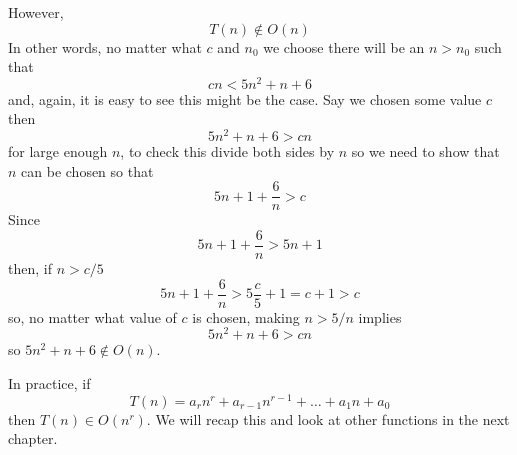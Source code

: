 \documentclass[11pt,a4paper]{scrartcl}
\begin{document}
However, 
\begin{equation}
T(n)\not\in O(n)
\end{equation}
In other words, no matter what $c$ and $n_0$ we choose there will be an $n>n_0$ such that
\begin{equation}
cn<5n^2+n+6
\end{equation}
and, again, it is easy to see this might be the case. Say we chosen
some value $c$ then
\begin{equation}
5n^2+n+6>cn
\end{equation}
for large enough $n$, to check this divide both sides by $n$ so we need to show that $n$ can be chosen so that
\begin{equation}
5n+1+\frac{6}{n}>c
\end{equation}
Since 
\begin{equation}
5n+1+\frac{6}{n}>5n+1
\end{equation}
then, if $n>c/5$
\begin{equation}
5n+1+\frac{6}{n}>5\frac{c}{5}+1=c+1>c
\end{equation}
so, no matter what value of $c$ is chosen, making $n>5/n$ implies
\begin{equation}
5n^2+n+6>cn
\end{equation}
so $5n^2+n+6\not\in O(n)$. 

In practice, if
\begin{equation}
T(n)=a_rn^r+a_{r-1}n^{r-1}+\ldots+a_1n+a_0
\end{equation}
then $T(n)\in O(n^r)$. We will recap this and look at other functions in the next chapter.
\end{document}

